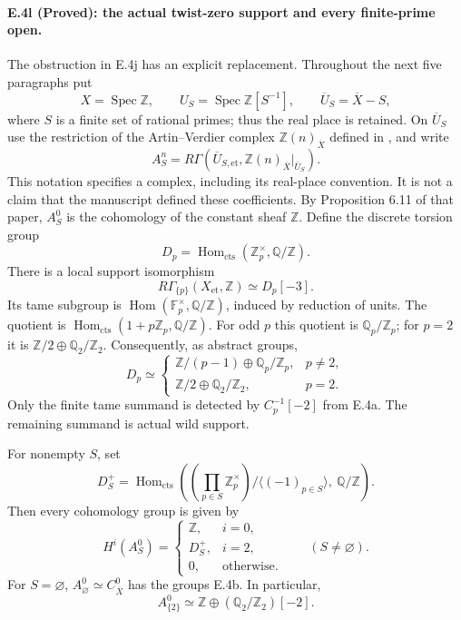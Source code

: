 \paragraph{E.4l (Proved): the actual twist-zero support and every finite-prime open.}
The obstruction in E.4j has an explicit replacement. Throughout the next
five paragraphs put
\[
 X=\operatorname{Spec}\mathbb Z,\qquad
 U_S=\operatorname{Spec}\mathbb Z[S^{-1}],\qquad
 \overline U_S=\overline X-S,
\]
where $S$ is a finite set of rational primes; thus the real place is
retained. On $\overline U_S$ use the restriction of the Artin--Verdier
complex $\mathbb Z(n)_{\overline X}$ defined in
\citet[\S6.2 and Definition 6.5]{D_FlachMorin2018}, and write
\[
 A_S^n=R\Gamma(\overline U_{S,\mathrm{et}},
                     \mathbb Z(n)_{\overline X}|_{\overline U_S}).
\]
This notation specifies a complex, including its real-place convention.
It is not a claim that the manuscript defined these coefficients.
By Proposition 6.11 of that paper, $A_S^0$ is the cohomology of the
constant sheaf $\mathbb Z$. Define the discrete torsion group
\[
 D_p=\operatorname{Hom}_{\mathrm{cts}}
                   (\mathbb Z_p^\times,\mathbb Q/\mathbb Z).
\]
There is a local support isomorphism
\[
 R\Gamma_{\{p\}}(X_{\mathrm{et}},\mathbb Z)\simeq D_p[-3].
 \tag{E.4.13}
\]
Its tame subgroup is
$\operatorname{Hom}(\mathbb F_p^\times,\mathbb Q/\mathbb Z)$, induced by
reduction of units. The quotient is
$\operatorname{Hom}_{\mathrm{cts}}(1+p\mathbb Z_p,\mathbb Q/\mathbb Z)$.
For odd $p$ this quotient is $\mathbb Q_p/\mathbb Z_p$; for $p=2$ it is
$\mathbb Z/2\oplus\mathbb Q_2/\mathbb Z_2$.
Consequently, as abstract groups,
\[
 D_p\simeq
 \begin{cases}
  \mathbb Z/(p-1)\oplus\mathbb Q_p/\mathbb Z_p,&p\ne2,\\
  \mathbb Z/2\oplus\mathbb Q_2/\mathbb Z_2,&p=2.
 \end{cases}
 \tag{E.4.14}
\]
Only the finite tame summand is detected by
$C_p^{-1}[-2]$ from E.4a. The remaining summand is actual wild support.

For nonempty $S$, set
\[
 D_S^+=\operatorname{Hom}_{\mathrm{cts}}
 \left(
   \left(\prod_{p\in S}\mathbb Z_p^\times\right)/
                  \langle(-1)_{p\in S}\rangle,\ \mathbb Q/\mathbb Z
 \right).
\]
Then every cohomology group is given by
\[
 H^i(A_S^0)=
 \begin{cases}
  \mathbb Z,&i=0,\\
  D_S^+,&i=2,\\
  0,&\text{otherwise}.
 \end{cases}
 \qquad(S\ne\varnothing).
 \tag{E.4.15}
\]
For $S=\varnothing$, $A_\varnothing^0\simeq C_{\overline X}^0$
has the groups E.4b. In particular,
\[
 A_{\{2\}}^0\simeq
      \mathbb Z\oplus(\mathbb Q_2/\mathbb Z_2)[-2].
 \tag{E.4.16}
\]

